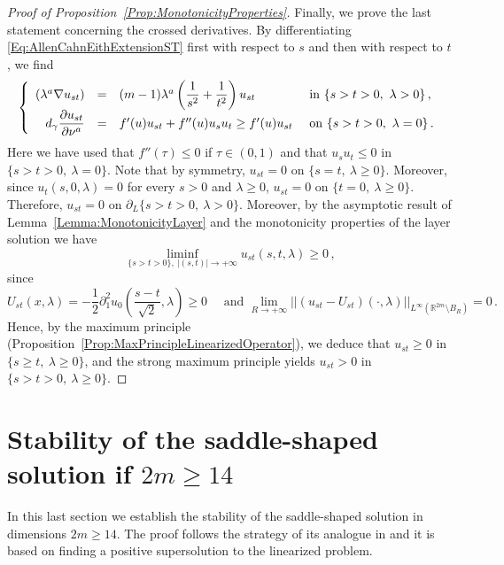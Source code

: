 \documentclass[12pt,reqno]{amsart}
\theoremstyle{definition}
\theoremstyle{remark}
\newcommand{\con}[1]{\mathbb{#1}}
\newcommand{\R}{\con{R}} %
\newcommand{\norm}[1]{\left | \left |{#1} \right | \right |}
\newcommand{\s}{\gamma}
\newcommand{\bpar}[1]{\left ( {#1}\right )}
\newcommand\beqc[1]{\left\{\begin{array}{#1}}
\newcommand\eeqc{\end{array} \right.}
\def\PDEsystem{rcll}
\let\div\relax
\DeclareMathOperator{\div}{div}
\numberwithin{equation}{section}
\begin{document}
\begin{proof}[Proof of Proposition~\ref{Prop:MonotonicityProperties}]
Finally, we prove the last statement concerning the crossed derivatives. By differentiating \eqref{Eq:AllenCahnEithExtensionST} first with respect to $s$ and then with respect to $t$, we find
$$
\beqc{\PDEsystem}
\div (\lambda^a \nabla u_{st}) & = & (m-1)\lambda^a \bpar{\dfrac{1}{s^2} + \dfrac{1}{t^2} } u_{st} & \text{ in } \{ s > t > 0 ,\ \lambda > 0\}\,, \\
d_\s \dfrac{\partial u_{st}}{\partial \nu^a}& = & f'(u)u_{st} + f''(u)u_s u_t \geq  f'(u)u_{st}& \text{ on }  \{ s > t > 0 , \ \lambda = 0\}\,.
\eeqc
$$
Here we have used that $f''(\tau) \leq 0$ if $\tau \in (0,1)$ and that $u_s u_t \leq 0$ in  $\{ s > t > 0 , \ \lambda = 0\}$.
Note that by symmetry, $u_{st}= 0$ on $\{s=t, \ \lambda \geq 0 \}$. Moreover, since $u_t(s,0,\lambda) = 0$ for every $s > 0$ and $\lambda \geq 0$, $u_{st}= 0$ on $\{t=0, \ \lambda \geq 0 \}$. Therefore, $u_{st}= 0$ on $\partial_L \{ s > t > 0 ,\ \lambda > 0\}$. Moreover, by the asymptotic result of Lemma~\ref{Lemma:MonotonicityLayer} and the monotonicity properties of the layer solution we have
$$
\liminf_{\{s> t>0\} ,\ |(s,t)|\to +\infty}  u_{st}(s,t,\lambda) \geq 0\,,
$$
since
$$
U_{st} (x,\lambda) = -\dfrac{1}{2} \partial_1^2 u_0\bpar{\dfrac{s-t}{\sqrt{2}}, \lambda} \geq 0 \quad \text{ and } \lim_{R\to +\infty} \norm{(u_{st} - U_{st})(\cdot,\lambda) }_{L^\infty(\R^{2m}\setminus B_{R})} = 0\,.
$$
Hence, by the maximum principle (Proposition~\ref{Prop:MaxPrincipleLinearizedOperator}), we deduce that $u_{st} \geq 0$ in $\{ s \geq t,\ \lambda \geq 0\}$, and the strong maximum principle yields $u_{st} > 0$ in $\{ s > t > 0,\ \lambda \geq 0\}$.
\end{proof}


\section{Stability of the saddle-shaped solution if $2m\geq 14$}
\label{Sec:Stability}

In this last section we establish the stability of the saddle-shaped solution in dimensions $2m\geq 14$. The proof follows the strategy of its analogue in \cite{Cabre-Saddle} and it is based on finding a positive supersolution to the linearized problem.
\end{document}
